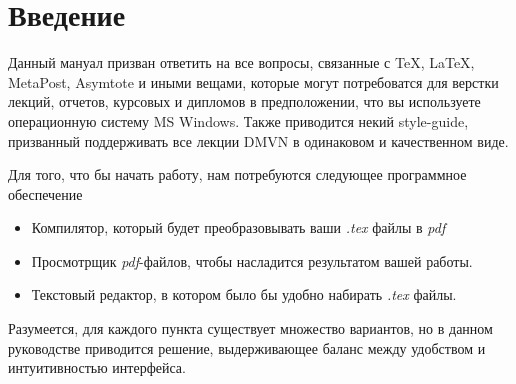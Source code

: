\section{Введение}
Данный мануал призван ответить на все вопросы, связанные с \TeX{},
\LaTeX{}, MetaPost, Asymtote и иными вещами, которые могут 
потребоватся для верстки лекций, отчетов, курсовых и дипломов в предположении, 
что вы используете операционную систему MS Windows. 
Также приводится некий style-guide, призванный поддерживать все лекции DMVN 
в одинаковом и качественном виде.

Для того, что бы начать работу, нам потребуются следующее программное обеспечение
\begin{itemize}
\item Компилятор, который будет преобразовывать ваши {\it .tex} файлы в {\it pdf}
\item Просмотрщик {\it pdf}-файлов, чтобы насладится результатом вашей работы.
\item Текстовый редактор, в котором было бы удобно набирать {\it .tex} файлы.
\end{itemize}
Разумеется, для каждого пункта существует множество вариантов, но в
данном руководстве приводится решение, выдерживающее баланс между
удобством и интуитивностью интерфейса.

